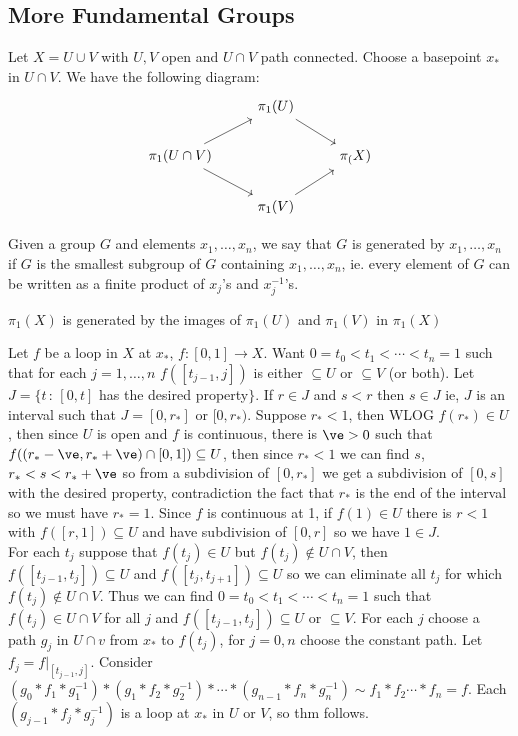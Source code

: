 
\subsection{More Fundamental Groups}

Let $X = U \cup V$ with $U, V$ open and $U \cap V$ path connected. Choose a basepoint $x_*$ in $U \cap V$. We have the following diagram: 
\[ \begin{tikzcd}
    & \pi_1(U) \arrow[rd] & \\ 
    \pi_1(U \cap V) \arrow[ru] \arrow[rd] & &  \pi_(X) \\ 
    & \pi_1(V) \arrow[ru] & 
\end{tikzcd}\]

\noindent
Given a group $G$ and elements $x_1, \ldots, x_n$, we say that $G$ is generated by $x_1, \ldots, x_n$ if $G$ is the smallest subgroup of $G$ containing $x_1, \ldots, x_n$, ie. every element of $G$ can be written as a finite product of $x_j$'s and $x_j^{-1}$'s. 

\begin{theorem}
    $\pi_1(X)$ is generated by the images of $\pi_1(U)$ and $\pi_1(V)$ in $\pi_1(X)$ 
\end{theorem}

\begin{pf}
    Let $f$ be a loop in $X$ at $x_*$, $f: [0,1] \to X$. Want $0 =t_0 < t_1 < \cdots < t_n=1$ such that for each $j=1, \ldots, n$ $f([t_{j-1}, j])$ is either $ \subseteq U$ or $\subseteq V$ (or both). Let $J = \{t \, : \, [0,t]$ has the desired property$\}$. If $r \in J$ and $s < r$ then $s \in J$ ie, $J$ is an interval such that $J = [0, r_*]$ or $[0, r_*)$. Suppose $r_* < 1$, then WLOG $f(r_*) \in U$, then since $U$ is open and $f$ is continuous, there is $\ve > 0$ such that $f((r_* - \ve, r_* + \ve) \cap [0,1]) \subseteq U$, then since $r_* < 1$ we can find $s$, $r_* < s < r_* + \ve$ so from a subdivision of $[0, r_*]$ we get a subdivision of $[0,s]$ with the desired property, contradiction the fact that $r_*$ is the end of the interval so we must have $r_* = 1$. Since $f$ is continuous at 1, if $f(1) \in U$ there is $r<1$ with $f([r,1]) \subseteq U$ and have subdivision of $[0,r]$ so we have $1 \in J$. \\
    For each $t_j$ suppose that $f(t_j) \in U$ but $f(t_j) \not\in U \cap V$, then $f([t_{j-1}, t_j]) \subseteq U$ and $f([t_j, t_{j+1}]) \subseteq U$ so we can eliminate all $t_j$ for which $f(t_j) \not\in U \cap V$. Thus we can find $0 = t_0 < t_1 < \cdots < t_n=1$ such that $f(t_j) \in U \cap V$ for all $j$ and $f([t_{j-1}, t_j]) \subseteq U$ or $\subseteq V$. For each $j$ choose a path $g_j$ in $U \cap v$ from $x_*$ to $f(t_j)$, for $j=0,n$ choose the constant path. Let $f_j = f|_{[t_{j-1}, j]}$. Consider $(g_0 * f_1 * g_1^{-1}) * (g_1 * f_2 * g_2^{-1}) * \cdots * (g_{n-1} * f_n * g_n^{-1}) \sim f_1 * f_2 \cdots * f_n = f$. Each $(g_{j-1} * f_j * g_j^{-1})$ is a loop at $x_*$ in $U$ or $V$, so thm follows. 
\end{pf}